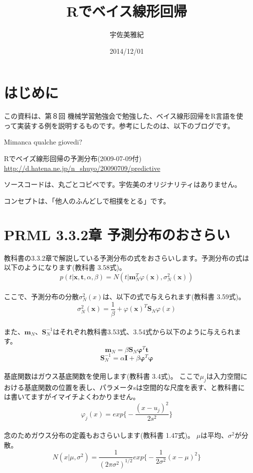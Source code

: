 \documentclass[uplatex]{jsarticle}
\title{Rでベイス線形回帰}
\author{宇佐美雅紀}
\date{2014/12/01}
\begin{document}
\maketitle

\section{はじめに}
この資料は、第８回 機械学習勉強会で勉強した、ベイス線形回帰をR言語を使って実装する例を説明するものです。参考にしたのは、以下のブログです。\par

\begin{center}
{\large Mimanca qualche giovedi?}\par
Rでベイズ線形回帰の予測分布(2009-07-09付)
\url{http://d.hatena.ne.jp/n_shuyo/20090709/predictive}
\end{center}
\par
ソースコードは、丸ごとコピペです。宇佐美のオリジナリティはありません。\par
コンセプトは、{\Large 「他人のふんどしで相撲をとる」}です。


\section{PRML 3.3.2章 予測分布のおさらい}
教科書の3.3.2章で解説している予測分布の式をおさらいします。予測分布の式は以下のようになります(教科書 3.58式)。
\begin{equation}
p(t|\mathbf{x},\mathbf{t},α,β)=\mathit{N}(t|\mathbf{m}^{T}_{N}φ(\mathbf{x}),σ^{2}_{N}(\mathbf{x}))
\end{equation}
\\
ここで、予測分布の分散$σ^2_N(x)$は、以下の式で与えられます(教科書 3.59式)。
\begin{equation}
σ^2_N(\mathbf{x})=\frac{1}{β}+φ(\mathbf{x})^T\mathbf{S}_Nφ(x)
\end{equation}
\\
また、$\mathbf{m}_N$、$\mathbf{S}^{-1}_N$はそれぞれ教科書3.53式、3.54式から以下のように与えられます。
\begin{equation}
\mathbf{m}_N=β\mathbf{S}_N\mathbf{φ}^T\mathbf{t}
\end{equation}
\begin{equation}
\mathbf{S}^{-1}_N=α\mathbf{I}+β\mathbf{φ}^T\mathbf{φ}
\end{equation}
\\
基底関数はガウス基底関数を使用します(教科書 3.4式)。
ここで$μ_j$は入力空間における基底関数の位置を表し、パラメータsは空間的な尺度を表す、と教科書には書いてますがイマイチよくわかりません。
\begin{equation}
φ_j(x)=exp\biggl\{-\frac{(x-u_j)^2}{2s^2}\biggl\}
\end{equation}
\\
念のためガウス分布の定義もおさらいします(教科書 1.47式)。
$μ$は平均、$σ^2$が分散。
\begin{equation}
N(x|μ,σ^2)=\frac{1}{(2πσ^2)^{1/2}}exp\biggl\{-\frac{1}{2σ^2}(x-μ)^2\biggl\}
\end{equation}
\end{document}
